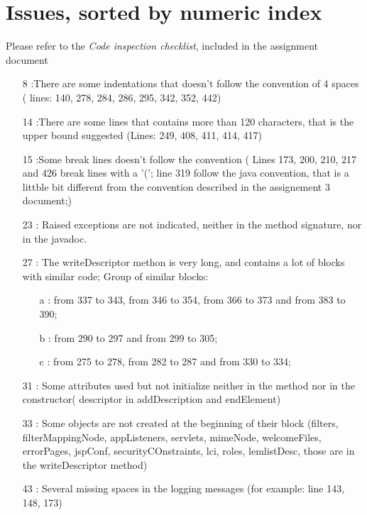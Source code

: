 \section{Issues, sorted by numeric index}
Please refer to the \textit{Code inspection checklist}, included in the assignment document

\begin{enumerate}
 \item [8]:There are some indentations that doesn't follow the convention of 4 spaces ( lines: 140, 278, 284, 286, 295, 342, 352, 442)
 \item [14]:There are some lines that contains more than 120 characters, that is the upper bound suggested (Lines: 249, 408, 411, 414, 417)
 \item [15]:Some break lines doesn't follow the convention ( Lines 173, 200, 210, 217 and 426 break lines with a '('; line 319 follow the java convention, that is a littble bit different from the convention described in the assignement 3 document;)
 \item [23]: Raised exceptions are not indicated, neither in the method signature, nor in the javadoc.
 \item [27]: The writeDescriptor methon is very long, and contains a lot of blocks with similar code; Group of similar blocks:
   \begin{itemize}
    \item[a]: from 337 to 343, from 346 to 354, from 366 to 373 and from 383 to 390;
    \item[b]: from 290 to 297 and from 299 to 305;
    \item[c]: from 275 to 278, from 282 to 287 and from 330 to 334;
   \end {itemize}
 \item[31]: Some attributes used but not initialize neither in the method nor in the constructor( descriptor in addDescription and endElement)
 \item[33]: Some objects are not created at the beginning of their block (filters, filterMappingNode, appListeners, servlets, mimeNode, welcomeFiles, errorPages, jspConf, securityCOnstraints, lci, roles, lemlistDesc, those are in the writeDescriptor method)
 \item [43]: Several missing spaces in the logging messages (for example: line 143, 148, 173)
\end{enumerate}

